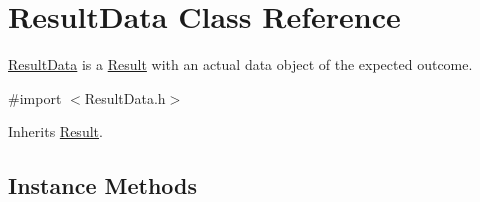 \hypertarget{interface_result_data}{}\section{Result\+Data Class Reference}
\label{interface_result_data}


\hyperlink{interface_result_data}{Result\+Data} is a \hyperlink{interface_result}{Result} with an actual data object of the expected outcome.  




{\ttfamily \#import $<$Result\+Data.\+h$>$}



Inherits \hyperlink{interface_result}{Result}.

\subsection*{Instance Methods}
